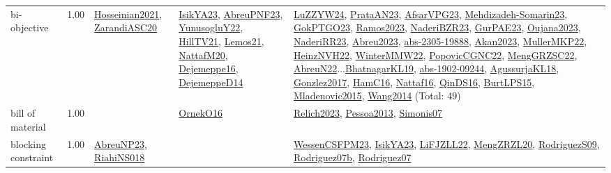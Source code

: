 {\begin{longtable}{p{3cm}r>{\raggedright\arraybackslash}p{6cm}>{\raggedright\arraybackslash}p{6cm}>{\raggedright\arraybackslash}p{8cm}}
\index{bi-objective}\index{Concepts!bi-objective}bi-objective &  1.00 & \hyperref[detail:Hosseinian2021]{Hosseinian2021}, \hyperref[detail:ZarandiASC20]{ZarandiASC20} & \hyperref[detail:IsikYA23]{IsikYA23}, \hyperref[detail:AbreuPNF23]{AbreuPNF23}, \hyperref[detail:YunusogluY22]{YunusogluY22}, \hyperref[detail:HillTV21]{HillTV21}, \hyperref[detail:Lemos21]{Lemos21}, \hyperref[detail:NattafM20]{NattafM20}, \hyperref[detail:Dejemeppe16]{Dejemeppe16}, \hyperref[detail:DejemeppeD14]{DejemeppeD14} & \hyperref[detail:LuZZYW24]{LuZZYW24}, \hyperref[detail:PrataAN23]{PrataAN23}, \hyperref[detail:AfsarVPG23]{AfsarVPG23}, \hyperref[detail:Mehdizadeh-Somarin23]{Mehdizadeh-Somarin23}, \hyperref[detail:GokPTGO23]{GokPTGO23}, \hyperref[detail:Ramos2023]{Ramos2023}, \hyperref[detail:NaderiBZR23]{NaderiBZR23}, \hyperref[detail:GurPAE23]{GurPAE23}, \hyperref[detail:Oujana2023]{Oujana2023}, \hyperref[detail:NaderiRR23]{NaderiRR23}, \hyperref[detail:Abreu2023]{Abreu2023}, \hyperref[detail:abs-2305-19888]{abs-2305-19888}, \hyperref[detail:Akan2023]{Akan2023}, \hyperref[detail:MullerMKP22]{MullerMKP22}, \hyperref[detail:HeinzNVH22]{HeinzNVH22}, \hyperref[detail:WinterMMW22]{WinterMMW22}, \hyperref[detail:PopovicCGNC22]{PopovicCGNC22}, \hyperref[detail:MengGRZSC22]{MengGRZSC22}, \hyperref[detail:AbreuN22]{AbreuN22}...\hyperref[detail:BhatnagarKL19]{BhatnagarKL19}, \hyperref[detail:abs-1902-09244]{abs-1902-09244}, \hyperref[detail:AgussurjaKL18]{AgussurjaKL18}, \hyperref[detail:Gonzlez2017]{Gonzlez2017}, \hyperref[detail:HamC16]{HamC16}, \hyperref[detail:Nattaf16]{Nattaf16}, \hyperref[detail:QinDS16]{QinDS16}, \hyperref[detail:BurtLPS15]{BurtLPS15}, \hyperref[detail:Mladenovic2015]{Mladenovic2015}, \hyperref[detail:Wang2014]{Wang2014} (Total: 49)\\
\index{bill of material}\index{Concepts!bill of material}bill of material &  1.00 &  & \hyperref[detail:OrnekO16]{OrnekO16} & \hyperref[detail:Relich2023]{Relich2023}, \hyperref[detail:Pessoa2013]{Pessoa2013}, \hyperref[detail:Simonis07]{Simonis07}\\
\index{blocking constraint}\index{Concepts!blocking constraint}blocking constraint &  1.00 & \hyperref[detail:AbreuNP23]{AbreuNP23}, \hyperref[detail:RiahiNS018]{RiahiNS018} &  & \hyperref[detail:WessenCSFPM23]{WessenCSFPM23}, \hyperref[detail:IsikYA23]{IsikYA23}, \hyperref[detail:LiFJZLL22]{LiFJZLL22}, \hyperref[detail:MengZRZL20]{MengZRZL20}, \hyperref[detail:RodriguezS09]{RodriguezS09}, \hyperref[detail:Rodriguez07b]{Rodriguez07b}, \hyperref[detail:Rodriguez07]{Rodriguez07}\\

\end{longtable}}
